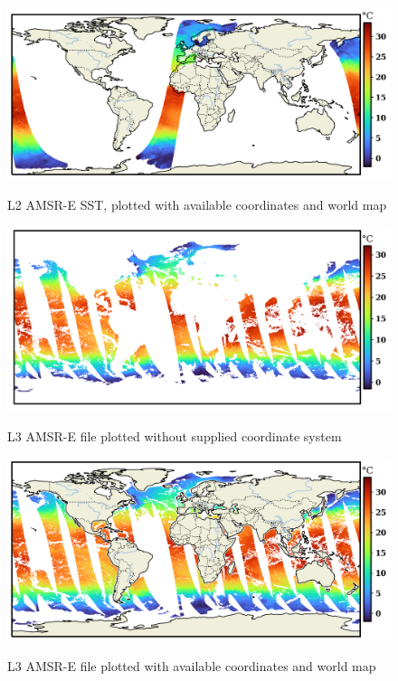 \begin{figure}[!ht]
	\centering
    \caption{L2 AMSR-E SST, plotted with available coordinates and world map}
	\includegraphics[width=1.0\linewidth]{m2/ims/fig2_2.png}
    \label{fig2_2}
\end{figure}

\begin{figure}[!ht]
	\centering
    \caption{L3 AMSR-E file plotted without supplied coordinate system}
	\includegraphics[width=1.0\linewidth]{m2/ims/fig2_3.png}
    \label{fig2_3}
\end{figure}

\begin{figure}[!ht]
	\centering
    \caption{L3 AMSR-E file plotted with available coordinates and world map}
	\includegraphics[width=1.0\linewidth]{m2/ims/fig2_4.png}
    \label{fig2_4}
\end{figure}

